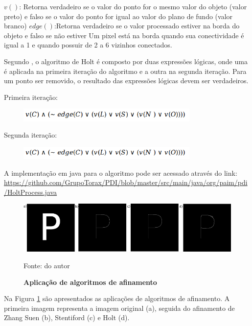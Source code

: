 \documentclass[
	12pt,				%
	oneside,			%
	a4paper,			%
	english,			%
	french,				%
	spanish,			%
	brazil,				%
	]{abntex2}
\begin{document}
\(v()\): Retorna verdadeiro se o valor do ponto for o mesmo valor do objeto (valor preto) e falso se o valor do ponto for igual ao valor do plano de fundo (valor branco)
\(edge()\):Retorna verdadeiro se o valor processado estiver na borda do objeto e falso se não estiver
Um pixel está na borda quando sua conectividade é igual a 1 e quando possuir de 2 a 6 vizinhos conectados. 

Segundo \citet{guilherme:2007}, o algoritmo de Holt é composto por duas expressões lógicas, onde uma é aplicada na primeira iteração do algoritmo e a outra na segunda iteração. Para um ponto ser removido, o resultado das expressões lógicas devem ser verdadeiros.

Primeira iteração: 
\begin{figure}[ht]
\centering
\includegraphics[width=0.8\textwidth]{imagens/holt_formula1.png}
\end{figure}

Segunda iteração:
\begin{figure}[ht]
\centering
\includegraphics[width=0.8\textwidth]{imagens/holt_formula1.png}
\end{figure}

A implementação em java para o algoritmo pode ser acessado através do link:
\url{https://github.com/GrupoTorax/PDI/blob/master/src/main/java/org/paim/pdi/HoltProcess.java} 

\begin{figure}[ht]
\centering
\caption{\textbf{Aplicação de algoritmos de afinamento}}
\includegraphics[width=1\textwidth]{imagens/esqueletizacao.png}

Fonte: do autor
\label{fig:esqueletizacao}
\end{figure}

Na Figura \ref{fig:esqueletizacao} são apresentados as aplicações de algoritmos de afinamento. A primeira imagem representa a imagem original (a), seguida do afinamento de Zhang Suen (b), Stentiford (c) e Holt (d). 
   
\end{document}
